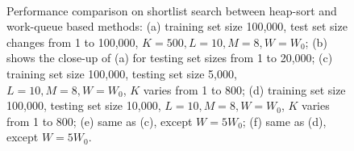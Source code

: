 \begin{figure}[t]
    \\
\caption[Performance comparison between heap-sort and work-queue based methods used in Bi-level LSH shortlist search]{\label{fig:6:res:workqueuecomp} Performance comparison on shortlist search between heap-sort and work-queue based methods: (a) training set size 100,000, test set size changes from 1 to 100,000, $K=500, L=10, M=8, W=W_0$; (b) shows the close-up of (a) for testing set sizes from 1 to 20,000; (c) training set size 100,000, testing set size 5,000, $L=10, M=8, W=W_0$, $K$ varies from 1 to 800; (d) training set size 100,000, testing set size 10,000, $L=10, M=8, W=W_0$, $K$ varies from 1 to 800; (e) same as (c), except $W = 5W_0$; (f) same as (d), except $W = 5W_0$.}
\end{figure}
